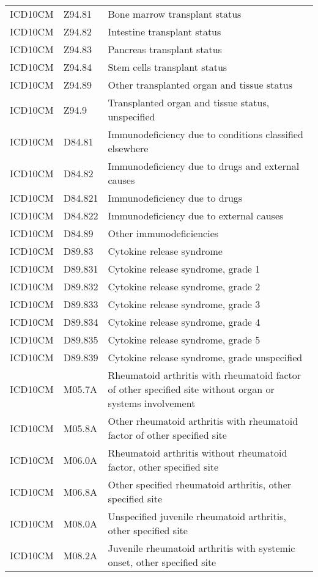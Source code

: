 \begin{longtable}{p{}p{}p{}}
  ICD10CM & Z94.81 & Bone marrow transplant status \\ 
  ICD10CM & Z94.82 & Intestine transplant status \\ 
  ICD10CM & Z94.83 & Pancreas transplant status \\ 
  ICD10CM & Z94.84 & Stem cells transplant status \\ 
  ICD10CM & Z94.89 & Other transplanted organ and tissue status \\ 
  ICD10CM & Z94.9 & Transplanted organ and tissue status, unspecified \\ 
  ICD10CM & D84.81 & Immunodeficiency due to conditions classified elsewhere \\ 
  ICD10CM & D84.82 & Immunodeficiency due to drugs and external causes \\ 
  ICD10CM & D84.821 & Immunodeficiency due to drugs \\ 
  ICD10CM & D84.822 & Immunodeficiency due to external causes \\ 
  ICD10CM & D84.89 & Other immunodeficiencies \\ 
  ICD10CM & D89.83 & Cytokine release syndrome \\ 
  ICD10CM & D89.831 & Cytokine release syndrome, grade 1 \\ 
  ICD10CM & D89.832 & Cytokine release syndrome, grade 2 \\ 
  ICD10CM & D89.833 & Cytokine release syndrome, grade 3 \\ 
  ICD10CM & D89.834 & Cytokine release syndrome, grade 4 \\ 
  ICD10CM & D89.835 & Cytokine release syndrome, grade 5 \\ 
  ICD10CM & D89.839 & Cytokine release syndrome, grade unspecified \\ 
  ICD10CM & M05.7A & Rheumatoid arthritis with rheumatoid factor of other specified site without organ or systems involvement \\ 
  ICD10CM & M05.8A & Other rheumatoid arthritis with rheumatoid factor of other specified site \\ 
  ICD10CM & M06.0A & Rheumatoid arthritis without rheumatoid factor, other specified site \\ 
  ICD10CM & M06.8A & Other specified rheumatoid arthritis, other specified site \\ 
  ICD10CM & M08.0A & Unspecified juvenile rheumatoid arthritis, other specified site \\ 
  ICD10CM & M08.2A & Juvenile rheumatoid arthritis with systemic onset, other specified site \\ 

\end{longtable}
